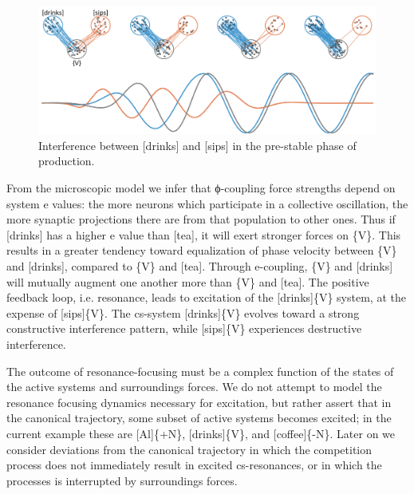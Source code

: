   
\begin{figure}
\includegraphics[width=\textwidth]{figures/Tilsen-img52.png}
\caption{Interference between [drinks] and [sips] in the pre-stable phase of production.}
\label{fig:4:2}
\end{figure}
 

  From the microscopic model we infer that ϕ{}-coupling force strengths depend on system e values: the more neurons which participate in a collective oscillation, the more synaptic projections there are from that population to other ones. Thus if [drinks] has a higher e value than [tea], it will exert stronger forces on \{V\}. This results in a greater tendency toward equalization of phase velocity between \{V\} and [drinks], compared to \{V\} and [tea]. Through e-coupling, \{V\} and [drinks] will mutually augment one another more than \{V\} and [tea]. The positive feedback loop, i.e. resonance, leads to excitation of the [drinks]\{V\} system, at the expense of [sips]\{V\}. The cs-system [drinks]\{V\} evolves toward a strong constructive interference pattern, while [sips]\{V\} experiences destructive interference.

  The outcome of resonance-focusing must be a complex function of the states of the active systems and surroundings forces. We do not attempt to model the resonance focusing dynamics necessary for excitation, but rather assert that in the canonical trajectory, some subset of active systems becomes excited; in the current example these are [Al]\{+N\}, [drinks]\{V\}, and [coffee]\{-N\}. Later on we consider deviations from the canonical trajectory in which the competition process does not immediately result in excited cs-resonances, or in which the processes is interrupted by surroundings forces.

